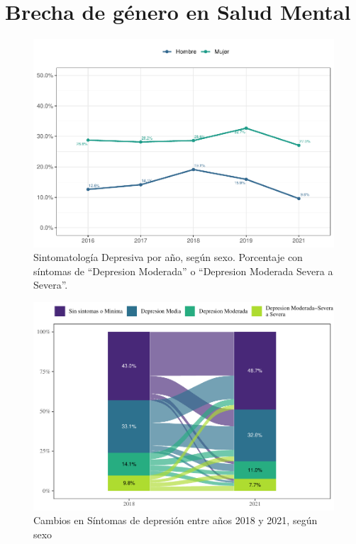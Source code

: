 \documentclass[
  12pt,
]{book}
\begin{document}
\hypertarget{brecha-de-guxe9nero-en-salud-mental}{%
\section{Brecha de género en Salud Mental}\label{brecha-de-guxe9nero-en-salud-mental}}

\begin{figure}

{\centering \includegraphics{reporte-elsoc_files/figure-latex/depre-year-sexo-1} 

}

\caption{Sintomatología Depresiva por año, según sexo. Porcentaje con síntomas de “Depresion Moderada” o “Depresion Moderada Severa a Severa”.}\label{fig:depre-year-sexo}
\end{figure}

\begin{figure}

{\centering \includegraphics{reporte-elsoc_files/figure-latex/depre-sexo-1} 

}

\caption{Cambios en Síntomas de depresión entre años 2018 y 2021, según sexo}\label{fig:depre-sexo}
\end{figure}
\end{document}

